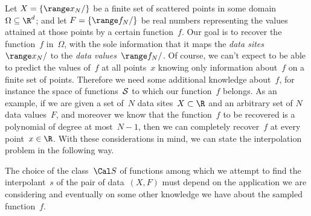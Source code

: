 

Let $X = \{\range x_N/\}$ be a finite set of scattered points in some domain~$\Omega\subseteq \R^d$; and let $F=\{\range f_N/\}$ be real numbers representing the values attained at those points by a certain function~$f$.  Our goal is to recover the function~$f$ in~$\Omega$, with the sole information that it maps the {\em data sites}~$\range x_N/$ to the {\em data values}~$\range f_N/$.  Of course, we can't expect to be able to predict the values of~$f$ at all points~$x$ knowing only information about~$f$ on a finite set of points.  Therefore we need some additional knowledge about~$f$, for instance the space of functions~$\cal S$ to which our function~$f$ belongs.  As an example, if we are given a set of~$N$ data sites~$X\subset \R$ and an arbitrary set of $N$ data values~$F$, and moreover we know that the function~$f$ to be recovered is a polynomial of degree at most~$N-1$, then we can completely recover~$f$ at every point~$x\in\R$.  With these considerations in mind, we can state the interpolation problem in the following way.

\medskip

\medskip

\noindent The choice of the class~$\Cal S$ of functions among which we attempt to find the interpolant~$s$ of the pair of data~$(X, F)$ must depend on the application we are considering and eventually on some other knowledge we have about the sampled function~$f$. 

